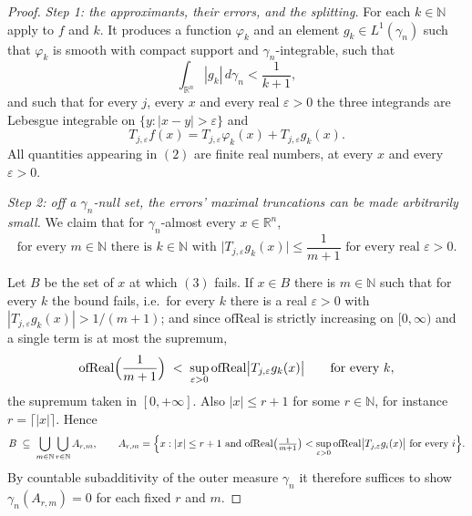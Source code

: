 \begin{proof}
\emph{Step 1: the approximants, their errors, and the splitting.}
For each $k \in \mathbb{N}$ apply  to
$f$ and $k$.  It produces a function $\varphi_k$ and an element
$g_k \in L^1(\gamma_n)$ such that $\varphi_k$ is smooth with compact support
and $\gamma_n$-integrable, such that
\begin{equation*}
  \int_{\mathbb{R}^n}|g_k|\,d\gamma_n < \frac1{k+1} , \tag{1}
\end{equation*}
and such that for every $j$, every $x$ and every real $\varepsilon > 0$ the
three integrands are Lebesgue integrable on $\{y : |x-y| > \varepsilon\}$ and
\begin{equation*}
  T_{j,\varepsilon}f(x)
    = T_{j,\varepsilon}\varphi_k(x) + T_{j,\varepsilon}g_k(x) . \tag{2}
\end{equation*}
All quantities appearing in $(2)$ are finite real numbers, at every $x$ and
every $\varepsilon > 0$.

\emph{Step 2: off a $\gamma_n$-null set, the errors' maximal truncations can be
made arbitrarily small.}  We claim that for $\gamma_n$-almost every
$x \in \mathbb{R}^n$,
\begin{equation*}
  \text{for every } m \in \mathbb{N} \text{ there is } k \in \mathbb{N}
  \text{ with } \bigl|T_{j,\varepsilon}g_k(x)\bigr| \leq \frac1{m+1}
  \text{ for every real } \varepsilon > 0 . \tag{3}
\end{equation*}

Let $B$ be the set of $x$ at which $(3)$ fails.  If $x \in B$ there is
$m \in \mathbb{N}$ such that for every $k$ the bound fails, i.e.\ for every $k$
there is a real $\varepsilon > 0$ with
$|T_{j,\varepsilon}g_k(x)| > 1/(m+1)$; and since
$\mathrm{ofReal}$ is strictly increasing on $[0,\infty)$ and a single term is
at most the supremum,
\[
  \mathrm{ofReal}\Bigl(\frac1{m+1}\Bigr)
    \;<\; \sup_{\varepsilon>0}\mathrm{ofReal}\bigl|T_{j,\varepsilon}g_k(x)\bigr|
  \qquad\text{for every } k ,
\]
the supremum taken in $[0,+\infty]$.  Also $|x| \leq r+1$ for some
$r \in \mathbb{N}$, for instance $r = \lceil|x|\rceil$.  Hence
\[
  B \;\subseteq\; \bigcup_{m\in\mathbb{N}}\bigcup_{r\in\mathbb{N}}A_{r,m},
  \qquad
  A_{r,m} = \Bigl\{x : |x| \leq r+1 \text{ and }
    \mathrm{ofReal}\bigl(\tfrac1{m+1}\bigr)
      < \sup_{\varepsilon>0}\mathrm{ofReal}\bigl|T_{j,\varepsilon}g_i(x)\bigr|
    \text{ for every } i\Bigr\} .
\]
By countable subadditivity of the outer measure $\gamma_n$ it therefore
suffices to show $\gamma_n(A_{r,m}) = 0$ for each fixed $r$ and $m$.


\end{proof}

